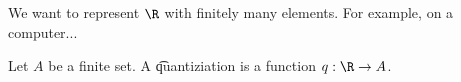 

We want to represent $\R$ with finitely many elements. For example, on a computer...


Let $A$ be a finite set.
A \t{quantiziation} is a function $q: \R \to A$.

\blankpage
